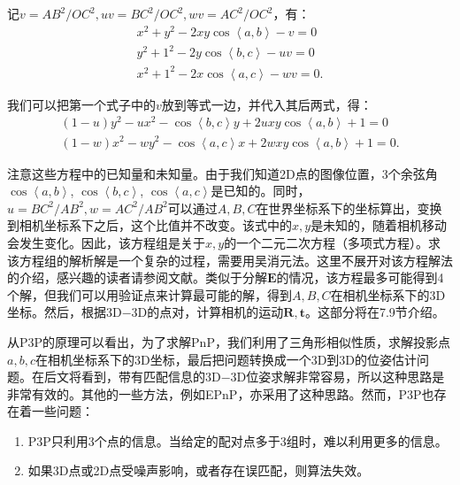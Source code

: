 记$v = AB^2/OC^2, uv = BC^2/OC^2, wv = AC^2/OC^2$，有：
\begin{equation}
\begin{array}{l}
{x^2} + {y^2} - 2xy\cos \left\langle a,b \right \rangle  - v = 0\\
{y^2} + {1^2} - 2y\cos \left\langle b,c \right \rangle  - uv = 0\\
{x^2} + {1^2} - 2x\cos \left\langle a,c \right \rangle  - wv = 0.
\end{array}
\end{equation}

我们可以把第一个式子中的$v$放到等式一边，并代入其后两式，得：
\begin{equation}
\begin{array}{l}
\left( {1 - u} \right){y^2} - u{x^2} - \cos \left\langle b,c \right \rangle y + 2uxy\cos \left\langle a,b \right \rangle  + 1 = 0 \\
\left( {1 - w} \right){x^2} - w{y^2} - \cos \left\langle a,c \right \rangle x + 2wxy\cos \left\langle a,b \right \rangle  + 1 = 0.
\end{array}
\end{equation}

注意这些方程中的已知量和未知量。由于我们知道2D点的图像位置，3个余弦角$\cos \left \langle a,b \right \rangle$, $\cos \left\langle b,c \right \rangle$, $\cos \left\langle a,c \right \rangle$是已知的。同时，$u=BC^2/AB^2, w=AC^2/AB^2$可以通过$A,B,C$在世界坐标系下的坐标算出，变换到相机坐标系下之后，这个比值并不改变。该式中的$x,y$是未知的，随着相机移动会发生变化。因此，该方程组是关于$x,y$的一个二元二次方程（多项式方程）。求该方程组的解析解是一个复杂的过程，需要用吴消元法。这里不展开对该方程解法的介绍，感兴趣的读者请参阅文献\cite{GaoHouTangEtAl2003}。类似于分解$\bm{E}$的情况，该方程最多可能得到4个解，但我们可以用验证点来计算最可能的解，得到$A,B,C$在相机坐标系下的3D坐标。然后，根据3D−3D的点对，计算相机的运动$\bm{R}, \bm{t}$。这部分将在7.9节介绍。

从P3P的原理可以看出，为了求解PnP，我们利用了三角形相似性质，求解投影点$a,b,c$在相机坐标系下的3D坐标，最后把问题转换成一个3D到3D的位姿估计问题。在后文将看到，带有匹配信息的3D−3D位姿求解非常容易，所以这种思路是非常有效的。其他的一些方法，例如EPnP，亦采用了这种思路。然而，P3P也存在着一些问题：

\begin{enumerate}
	\item P3P只利用3个点的信息。当给定的配对点多于3组时，难以利用更多的信息。
	\item 如果3D点或2D点受噪声影响，或者存在误匹配，则算法失效。
\end{enumerate}

